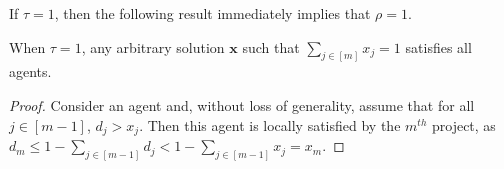 \documentclass{article}
\begin{document}
If $\tau=1$, then the following result immediately implies that %
$\rho=1$. %
\begin{proposition} \label{prop:tau=1}
When $\tau=1$, any arbitrary solution $\mathbf{x}$ such that $\sum_{j \in [m]}x_j = 1$ satisfies all agents.
\end{proposition}
\begin{proof} Consider an agent and, without loss of generality, assume that for all $j \in [m-1]$, $d_j > x_j$. Then this agent is locally satisfied by the $m^{th}$ project, as $d_m \leq 1 - \sum_{j \in [m-1]} d_j < 1- \sum_{j \in [m-1]} x_j = x_m$.
\end{proof}



\begin{comment}

In this section, we are interested in the problem of determining the best ratio $\rho$ such that a single solution is guaranteed to satisfy 
$\rho n$ agents, for every possible instance, when $\tau=m-1$. We have seen in Section \ref{sec:saa_ABO} that $\rho=1$ when $m=2$. Here we consider that $m > 2$.  

When $\tau=m/2$, we have seen in Section \ref{sec:wcf:half} that $\rho$ is at least $1/2$ %
so an important part of the agents can be satisfied for all $n$ and $m$. We are going to show that when $\tau=m-1$ which is more demanding than $\tau=m/2$, $\rho$ decreases with $n$ and $m$.

Let $k$ be an integer such that $m \ge k > 2$, and consider an instance with $m$ projects and $m$ agents. For each $i \in [m]$, agent $i$'s demands for projects $i$ and $i+1$ are $1/k$ and $1-1/k$, respectively, and zero everywhere else.\footnote{We suppose that agent $m$'s demands for projects $m$ and $1$ are $1/k$ and $1-1/k$, respectively, and zero everywhere else.}   

For this instance, Observation \ref{obs2} indicates that we can restrict the coordinates of a solution ${\bf x}$ to $\{0,\frac{1}{k},\frac{k-1}{k}\}$. If one coordinate of ${\bf x}$ is equal to $\frac{k-1}{k}$, then another one is equal to $\frac{1}{k}$, and the remaining coordinates are equal to 0. Such a solution can satisfy at most two agents out of $m$. A better option is that ${\bf x}$ contains $k$ coordinates equal to $\frac{1}{k}$, and the remaining ones are null. Such a solution satisfies $k$ agents out of $m$.  

\end{comment}
\end{document}
